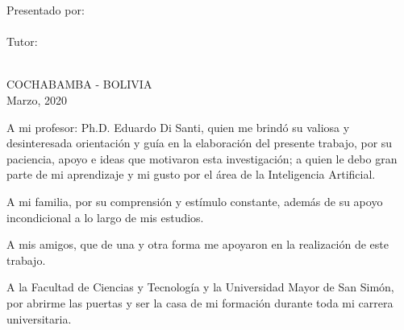 \documentclass[11pt,spanish,singlespacing,headsepline]{MastersDoctoralThesis}
\begin{document}
\begin{titlepage}
\begin{center}
{\Large Presentado por:}\\

\hspace{ 0.50\textwidth} \Large{\authorname}\\

\hspace{ -0.16\textwidth} {\Large Tutor:}\\

\hspace{ 0.56\textwidth} {\Large{\supname}}\\

\hspace{ 0.35\textwidth} 
\end{center}

\vspace*{0.2cm}
 
\begin{center}
\vspace*{1.5cm}
\Large{COCHABAMBA - BOLIVIA}\hspace*{1cm}\Large{\\Marzo, 2020}	
\end{center}	
	
\end{titlepage}

\cleardoublepage


\begin{acknowledgements}
\addchaptertocentry{\acknowledgementname} 
\bigskip

A mi profesor: Ph.D. Eduardo Di Santi, quien me brind\'{o} su valiosa y desinteresada orientaci\'{o}n y gu\'{i}a en la elaboraci\'{o}n del presente trabajo, por su paciencia, apoyo e ideas que motivaron esta investigaci\'{o}n; a quien le debo gran parte de mi aprendizaje y mi gusto por el \'{a}rea de la Inteligencia Artificial.

\vspace{5mm} %

A mi familia, por su comprensi\'{o}n y est\'{i}mulo constante, adem\'{a}s de su apoyo incondicional a lo largo de mis estudios.

\vspace{5mm} %

A mis amigos, que de una y otra forma me apoyaron en la realizaci\'{o}n de este trabajo.

\vspace{5mm} %

A la Facultad de Ciencias y Tecnolog\'{i}a y la Universidad Mayor de San Sim\'{o}n, por abrirme las puertas y ser la casa de mi formaci\'{o}n durante toda mi carrera universitaria.

\end{acknowledgements}
\end{document}
